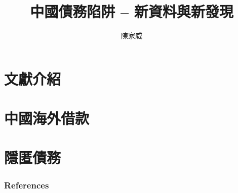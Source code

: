 \documentclass[mathserif]{beamer}
\title{
    中國債務陷阱 -- 新資料與新發現
}
\author{\small 陳家威}
\begin{document}
    \begin{frame}
        \maketitle
    \end{frame}

    \section{文獻介紹}
    

    \section{中國海外借款}
    

    \section{隱匿債務}
    

    \begin{frame}[allowframebreaks]
            \frametitle{References}
            
            
    \end{frame}
\end{document}
